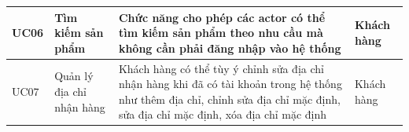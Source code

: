 \documentclass[12pt,a4paper,2sides]{report}
\begin{document}
\begin{tabular}{|p{1cm}|p{3cm}|p{6cm}|p{3cm}|}
\hline
UC06 & Tìm kiếm sản phẩm                      & Chức năng cho phép các actor có thể tìm kiếm sản phẩm theo nhu cầu mà không cần phải đăng nhập vào hệ thống                                                                                                                              & Khách hàng                                                              \\ 
\hline
UC07 & Quản lý địa chỉ nhận hàng              & Khách hàng có thể tùy ý chỉnh sửa địa chỉ nhận hàng khi đã có tài khoản trong hệ thống như thêm địa chỉ, chỉnh sửa địa chỉ mặc định, sửa địa chỉ mặc định, xóa địa chỉ mặc định                                                          & Khách hàng                                                              \\ 
\hline
\end{tabular}\\
\end{document}

